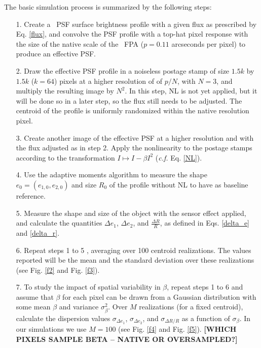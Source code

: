 \documentclass[11pt,preprint,flushrt]{aastex}
\begin{document}
The basic simulation process is summarized by the following steps:  
\begin{itemize}
\item[1.] Create a \wfa\ PSF surface brightness profile with a given flux as prescribed by Eq. \ref{flux}, and convolve the PSF profile with a top-hat pixel response with the size of the native scale of the \wfa\ FPA ($p=0.11$ arcseconds per pixel) to produce an effective PSF. 
\item[2.] Draw the effective PSF profile in a noiseless postage stamp of size $1.5k$ by $1.5k$ ($k=64$) pixels at a higher resolution of of $p/N$, with $N=3$, and multiply the resulting image by $N^2$. In this step, NL is not yet applied, but it will be done so in a later step, so the flux still needs to be adjusted. The centroid of the profile is uniformly randomized within the native resolution pixel.
\item[3.] Create another image of the effective PSF at a higher resolution and with the flux adjusted as in step 2. 
Apply the nonlinearity to the postage stamps according to the transformation $I \mapsto I - \beta I^2$ (\emph{c.f.} Eq. \ref{NL}).
\item[4.] Use the adaptive moments algorithm to measure the shape $e_0=(e_{1,0}, e_{2,0})$ and size $R_0$ of the profile without NL to have as baseline reference.
\item[5.] Measure the shape and size of the object with the sensor effect applied, and calculate the quantities $\Delta e_1$, $\Delta e_2$, and $\frac{\Delta R}{R}$, as defined in Eqs. \ref{delta_e} and \ref{delta_r}. 
\item [6.] Repeat steps 1 to 5 %
, averaging over 100 centroid realizations. The values reported will be the mean and the standard deviation over these realizations (see Fig. \ref{f2} and Fig. \ref{f3}).
\item[7.] To study the impact of spatial variability in $\beta$, repeat steps 1 to 6 and assume that $\beta$ for each pixel can be drawn from a Gaussian distribution with some mean $\beta$ and variance $\sigma_{\beta}^2$. Over $M$ realizations (for a fixed centroid), calculate the dispersion values $\sigma_{\Delta e_1}$, $\sigma_{\Delta e_2}$, and $\sigma_{\Delta R/R}$ as a function of $\sigma_{\beta}$. In our simulations we use $M=100$ (see Fig. \ref{f4} and Fig. \ref{f5}). \textbf{[WHICH PIXELS SAMPLE BETA -- NATIVE OR OVERSAMPLED?]}

\end{itemize}
\end{document}
